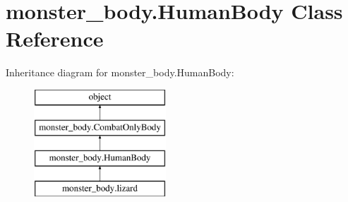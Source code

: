 \hypertarget{classmonster__body_1_1_human_body}{}\section{monster\+\_\+body.\+Human\+Body Class Reference}
\label{classmonster__body_1_1_human_body}
Inheritance diagram for monster\+\_\+body.\+Human\+Body\+:\begin{figure}[H]
\begin{center}
\leavevmode
\includegraphics[height=4.000000cm]{classmonster__body_1_1_human_body}
\end{center}
\end{figure}
